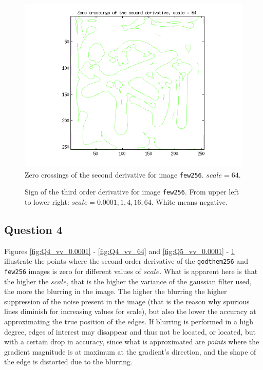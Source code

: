 \begin{figure}[H]
	\centering
	\includegraphics[scale=0.8]{./images/Q5/vv/64.png}
	\caption{Zero crossings of the second derivative for image \texttt{few256}. $scale = 64$.}
	\label{fig:Q5_vv_64}
\end{figure}


\begin{figure}[H]
	\centering
	\scalebox{0.8}{}
	\caption{Sign of the third order derivative for image \texttt{few256}.
  From upper left to lower right: $scale = 0.0001, 1, 4, 16, 64$. White means negative.}
	\label{fig:Q5_vvv_}
\end{figure}



\subsection{Question 4}

Figures \ref{fig:Q4_vv_0.0001} - \ref{fig:Q4_vv_64} and
\ref{fig:Q5_vv_0.0001} - \ref{fig:Q5_vv_64} illustrate the points where
the second order derivative of the \texttt{godthem256} and \texttt{few256} images
is zero for different values of $scale$. What is apparent here is that the higher the $scale$,
that is the higher the variance of the gaussian filter used, the more the blurring
in the image. The higher the blurring the higher suppression of the noise
present in the image (that is the reason why spurious lines diminish for
increasing values for scale), but also the lower the accuracy at approximating
the true position of the edges. If blurring is performed in a high degree,
edges of interest may disappear and thus not be located,
or located, but with a certain drop in accuracy, since what is approximated are
\textit{points} where the gradient magnitude is at maximum at the gradient's direction,
and the shape of the edge is distorted due to the blurring.


